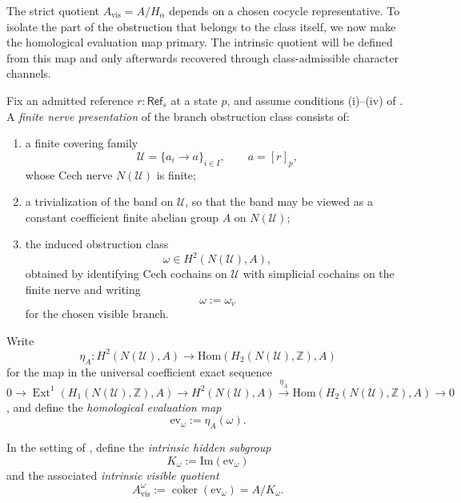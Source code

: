 The strict quotient $A_{\mathrm{vis}}=A/H_\alpha$ depends on a chosen cocycle representative. To isolate the part of the obstruction that belongs to the class itself, we now make the homological evaluation map primary. The intrinsic quotient will be defined from this map and only afterwards recovered through class-admissible character channels.

\begin{definition}\label{def:finite-nerve-presentation}
Fix an admitted reference $r:\mathsf{Ref}_s$ at a state $p$, and assume conditions \textup{(i)}--\textup{(iv)} of . A \emph{finite nerve presentation} of the branch obstruction class consists of:
\begin{enumerate}[label=(\roman*),nosep]
\item a finite covering family
\[
\mathcal U=\{a_i\to a\}_{i\in I},
\qquad
a=[r]_p,
\]
whose Cech nerve $N(\mathcal U)$ is finite;
\item a trivialization of the band on $\mathcal U$, so that the band may be viewed as a constant coefficient finite abelian group $A$ on $N(\mathcal U)$;
\item the induced obstruction class
\[
\omega\in H^2(N(\mathcal U),A),
\]
obtained by identifying Cech cochains on $\mathcal U$ with simplicial cochains on the finite nerve and writing
\[
\omega:=\omega_v
\]
for the chosen visible branch.
\end{enumerate}
Write
\[
\eta_A:H^2(N(\mathcal U),A)\longrightarrow \mathrm{Hom}(H_2(N(\mathcal U),\mathbb Z),A)
\]
for the map in the universal coefficient exact sequence
\[
0\to \operatorname{Ext}^1(H_1(N(\mathcal U),\mathbb Z),A)\to H^2(N(\mathcal U),A)\xrightarrow{\eta_A}\mathrm{Hom}(H_2(N(\mathcal U),\mathbb Z),A)\to 0
\]
\cite[Sec.~3.1]{Hatcher2002}, and define the \emph{homological evaluation map}
\[
\mathrm{ev}_{\omega}:=\eta_A(\omega).
\]
\end{definition}

\begin{definition}\label{def:intrinsic-visible-quotient}
In the setting of , define the \emph{intrinsic hidden subgroup}
\[
K_{\omega}:=\mathrm{Im}(\mathrm{ev}_{\omega})
\]
and the associated \emph{intrinsic visible quotient}
\[
A_{\mathrm{vis}}^{\omega}:=\operatorname{coker}(\mathrm{ev}_{\omega})=A/K_{\omega}.
\]
\end{definition}

